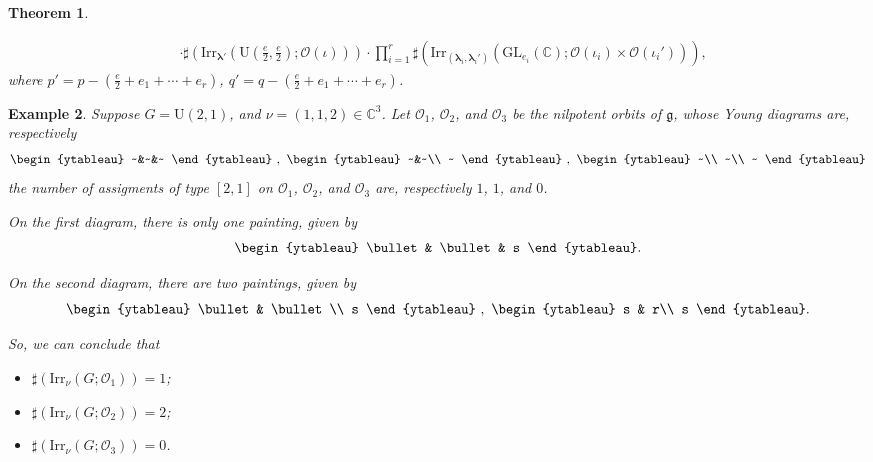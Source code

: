\documentclass[12pt, a4paper]{amsart}
\numberwithin{equation}{section}
\newtheorem{thm}{Theorem}[section]
\newtheorem{examp}[thm]{Example}
\newcommand{\blam}{{\boldsymbol{\lambda}}}
\newcommand{\BC}{{\mathbb {C}}}
\newcommand{\CO}{{\mathcal {O}}}
\newcommand{\fg}{\mathfrak{g}}
\newcommand{\GL}{{\mathrm{GL}}}
\newcommand{\U}{{\mathrm{U}}}
\newcommand{\Irr}{{\mathrm{Irr}}}
\begin{document}
\begin{thm}
\begin{enumerate}
\begin{align*}
            & \cdot \sharp(\Irr_{\blam'}(\U(\frac{e}{2},\frac{e}{2});\CO(\iota)))\cdot \prod_{i=1}^{r} \sharp(\Irr_{(\blam_i,\blam_i')}(\GL_{e_i}(\BC);\CO(\iota_i)\times \CO(\iota_i'))),
        \end{align*}
        where $p' = p - (\frac{e}{2} + e_1 + \cdots + e_r) $, $q' = q - (\frac{e}{2} + e_1 + \cdots + e_r)$.
    \end{enumerate}
\end{thm}

\begin{examp}
    Suppose $G = \U(2,1)$, and $\nu = (1,1,2) \in \BC^3$. Let $\CO_1$, $\CO_2$, and $\CO_3$ be the nilpotent orbits of $\fg$, whose Young diagrams are, respectively
    \[
        \begin{ytableau}
            ~&~&~
        \end{ytableau}
    ~,~
        \begin{ytableau}
            ~&~\\
            ~
        \end{ytableau}
    ~,~
        \begin{ytableau}
            ~\\
            ~\\
            ~
        \end{ytableau}
    \]
    the number of assigments of type $[2,1]$ on $\CO_1$, $\CO_2$, and $\CO_3$ are, respectively $1$, $1$, and $0$.

    On the first diagram, there is only one painting, given by
    \[
        \begin{ytableau}
            \bullet & \bullet & s
        \end{ytableau}.
    \]

    On the second diagram, there are two paintings, given by
    \[
    \begin{ytableau}
        \bullet & \bullet\\
        s    
    \end{ytableau}
    ~,~
    \begin{ytableau}
        s & r\\
        s
    \end{ytableau}.
    \]
            
    So, we can conclude that 
    \begin{itemize}
        \item $\sharp(\Irr_{\nu}(G;\CO_{1})) = 1$;
        \item $\sharp(\Irr_{\nu}(G;\CO_{2})) = 2$;
        \item $\sharp(\Irr_{\nu}(G;\CO_{3})) = 0$.
    \end{itemize}

    
\end{examp}
\end{document}
